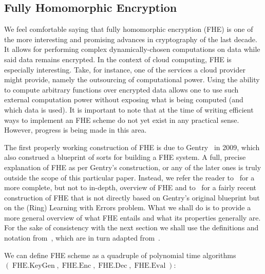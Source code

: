 \documentclass[11pt, a4paper]{article}
\newcommand{\op}[1]{\operatorname{#1}}
\begin{document}


\subsection{Fully Homomorphic Encryption}

We feel comfortable saying that fully homomorphic encryption (FHE) is one of the more interesting and promising advances in cryptography of the last decade. 
It allows for performing complex dynamically-chosen computations on data while said data remains encrypted. 
In the context of cloud computing, FHE is especially interesting.
Take, for instance, one of the services a cloud provider might provide, namely the outsourcing of computational power.
Using the ability to compute arbitrary functions over encrypted data allows one to use such external computation power without exposing what is being computed (and which data is used).
It is important to note that at the time of writing efficient ways to implement an FHE scheme do not yet exist in any practical sense.
However, progress is being made in this area.

The first properly working construction of FHE is due to Gentry~\cite{gentry2009fully} in 2009, which also construed a blueprint of sorts for building a FHE system.
A full, precise explanation of FHE as per Gentry's construction, or any of the later ones is truly outside the scope of this particular paper. 
Instead, we refer the reader to~\cite{vaikuntanathan2011computing} for a more complete, but not to in-depth, overview of FHE and to~\cite{brakerski2012leveled} for a fairly recent construction of FHE that is not directly based on Gentry's original blueprint but on the (Ring) Learning with Errors problem. 
What we shall do is to provide a more general overview of what FHE entails and what its properties generally are. 
For the sake of consistency with the next section we shall use the definitions and notation from~\cite{goldwasser2013reusable}, which are in turn adapted from~\cite{vaikuntanathan2011computing}.

We can define FHE scheme as a quadruple of polynomial time algorithms $(\op{FHE.KeyGen}, \op{FHE.Enc}, \op{FHE.Dec}, \op{FHE.Eval})$:
\end{document}

